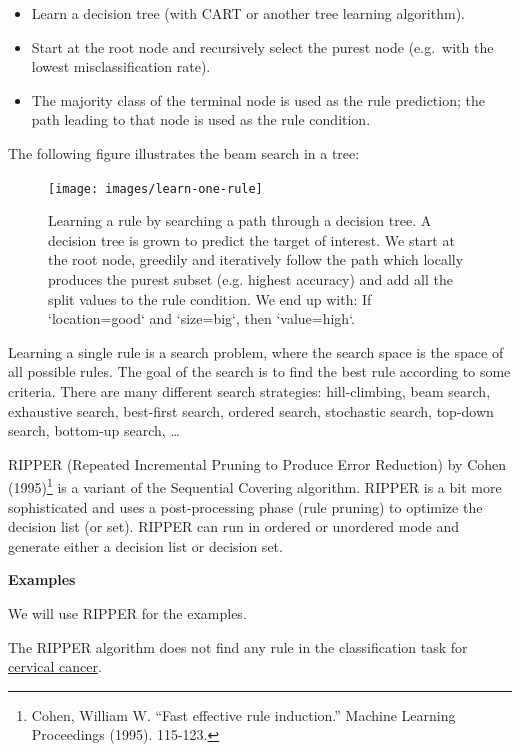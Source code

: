 \documentclass[
  11pt,
]{scrbook}
\providecommand{\tightlist}{%
  \setlength{\itemsep}{0pt}\setlength{\parskip}{0pt}}
\begin{document}
\begin{itemize}
\tightlist
\item
  Learn a decision tree (with CART or another tree learning algorithm).
\item
  Start at the root node and recursively select the purest node (e.g.~with the lowest misclassification rate).
\item
  The majority class of the terminal node is used as the rule prediction;
  the path leading to that node is used as the rule condition.
\end{itemize}

The following figure illustrates the beam search in a tree:

\begin{figure}

{\centering \texttt{[image: images/learn-one-rule]} 

}

\caption{Learning a rule by searching a path through a decision tree. A decision tree is grown to predict the target of interest. We start at the root node, greedily and iteratively follow the path which locally produces the purest subset (e.g. highest accuracy) and add all the split values to the rule condition. We end up with: If `location=good` and `size=big`, then `value=high`.}\label{fig:learn-one-rule}
\end{figure}

Learning a single rule is a search problem, where the search space is the space of all possible rules.
The goal of the search is to find the best rule according to some criteria.
There are many different search strategies:
hill-climbing, beam search, exhaustive search, best-first search, ordered search, stochastic search, top-down search, bottom-up search, \ldots{}

RIPPER (Repeated Incremental Pruning to Produce Error Reduction) by Cohen (1995)\footnote{Cohen, William W. ``Fast effective rule induction.'' Machine Learning Proceedings (1995). 115-123.} is a variant of the Sequential Covering algorithm.
RIPPER is a bit more sophisticated and uses a post-processing phase (rule pruning) to optimize the decision list (or set).
RIPPER can run in ordered or unordered mode and generate either a decision list or decision set.

\textbf{Examples}

We will use RIPPER for the examples.

The RIPPER algorithm does not find any rule in the classification task for \protect\hyperlink{cervical}{cervical cancer}.
\end{document}
